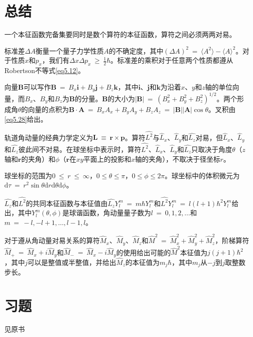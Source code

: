 \documentclass[12pt,a4paper,openany]{ctexbook}
\newcommand{\abs}[1]{\left| #1 \right|}
\newcommand{\ang}[1]{\langle #1 \rangle}
\newcommand{\dd}[1]{\mathrm{d} #1}
\newcommand{\dlt}{\Delta}
\newcommand{\pv}{\boldsymbol{r}} %
\newcommand{\lmv}{\boldsymbol{p}} %
\newcommand{\amv}{\boldsymbol{L}} %
\begin{document}
\section*{总结}
\begin{flushleft}
    \setlength{\parindent}{2em}
一个本征函数完备集要同时是数个算符的本征函数，算符之间必须两两对易。

标准差$\dlt A$衡量一个量子力学性质$A$的不确定度，其中$(\dlt A)^2\ =\ \ang{A^2}-\ang{A}^2$。对于性质$x$和$p_x$，我们有$\dlt x\dlt p_x\ \geq\ \frac{1}{2}\hbar$。标准差的乘积对于任意两个性质都遵从Robertson不等式\eqref{eq5.12}。

向量$\boldsymbol{B}$可以写作$\boldsymbol{B}\ =\ B_x\boldsymbol{i}+B_y\boldsymbol{j}+B_z\boldsymbol{k}$，其中$\boldsymbol{i}$、$\boldsymbol{j}$和$\boldsymbol{k}$为沿着$x$、$y$和$z$轴的单位向量，而$B_x$、$B_y$和$B_z$为$\boldsymbol{B}$的分量。$\boldsymbol{B}$的大小为$\abs{\boldsymbol{B}}\ =\ (B_x^2+B_y^2+B_z^2)^{1/2}$。两个形成角$\theta$的向量的点积为$\boldsymbol{B}\cdot\boldsymbol{A}\ =\ B_xA_x+B_yA_y+B_zA_z\ =\ \abs{\boldsymbol{B}}\abs{\boldsymbol{A}}\cos\theta$。叉积由\eqref{eq5.28}给出。

轨道角动量的经典力学定义为$\amv\ \equiv\ \pv\times\lmv$。算符$\hat{L^2}$与$\hat{L}_x$、$\hat{L}_y$和$\hat{L_z}$对易，但$\hat{L}_x$、$\hat{L}_y$和$\hat{L_z}$彼此间不对易。在球坐标中表示时，算符$\hat{L^2}$、$\hat{L}_x$、$\hat{L}_y$和$\hat{L_z}$只取决于角度$\theta$（$z$轴和$\pv$的夹角）和$\phi$（$\pv$在$xy$平面上的投影和$x$轴的夹角），不取决于径坐标$r$。

球坐标的范围为$0\ \leq\ r\ \leq\ \infty$，$0 \leq \theta \leq \pi$，$0 \leq \phi \leq 2\pi$。球坐标中的体积微元为$\dd\tau\ =\ r^2\sin\theta\dd r\dd\theta\dd\phi$。

$\hat{L_z}$和$\hat{L^2}$的共同本征函数与本征值由$\hat{L_z}Y_l^m\ =\ m\hbar Y_l^m$和$\hat{L^2}Y_l^m\ =\ l(l+1)\hbar^2Y_l^m$给出，其中$Y_l^m(\theta,\phi)$是球谐函数，角动量量子数为$l\ =\ 0,1,2,\dots$和$m\ =\ -l,-l+1,\dots,l-1,l$。

对于遵从角动量对易关系的算符$\hat{M}_x$、$\hat{M}_y$、$\hat{M}_z$和$\hat{M}^2\ =\ \hat{M}_x^2+\hat{M}_y^2+\hat{M}_z^2$，阶梯算符$\hat{M}_+\ =\ \hat{M}_x+i\hat{M}_y$和$\hat{M}_-\ =\ \hat{M}_x-i\hat{M}_y$的使用给出可能的$\hat{M}^2$本征值为$j(j+1)\hbar^2$，其中$j$可以是整值或半整值，并给出$\hat{M}_z$的本征值为$m_j\hbar$，其中$m_j$从$-j$到$j$取整数步长。
\end{flushleft}
\section*{习题}
见原书
\end{document}
